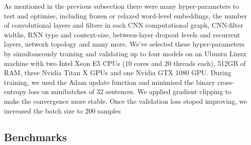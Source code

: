 \documentclass[twocolumn]{bmcart}%
\begin{document}
As mentioned in the previous subsection there were many hyper-parameters to test and optimise, including frozen or relaxed word-level embeddings, the number of convolutional layers and filters in each CNN computational graph, CNN-filter widths, RNN type and context-size, between-layer dropout levels and recurrent layers, network topology and many more.
We've selected these hyper-parameters by simultaneously training and validating up to four models on an Ubuntu Linux machine with two Intel Xeon E5 CPUs (10 cores and 20 threads each), 512GB of RAM, three Nvidia Titan X GPUs and one Nvidia GTX 1080 GPU.
During training, we used the Adam update function \cite{Kingma2014} and minimised the binary cross-entropy loss on minibatches of 32 sentences.
We applied gradient clipping to make the convergence more stable.
Once the validation loss stoped improving, we increased the batch size to 200 samples 

\subsection*{Benchmarks}
\end{document}
